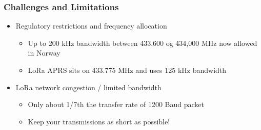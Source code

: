 \documentclass[aspectratio=169]{beamer}
\begin{document}
\begin{frame}[t]
  \frametitle{Challenges and Limitations}
  \begin{itemize}
    \item Regulatory restrictions and frequency allocation
    \medskip
    \begin{itemize}
      \item Up to 200 kHz bandwidth between 433,600 og 434,000 MHz now allowed in Norway
      \medskip
      \item LoRa APRS sits on 433.775 MHz and uses 125 kHz bandwidth
      \medskip
    \end{itemize}
    \item LoRa network congestion / limited bandwidth 
    \medskip
    \begin{itemize}
      \item Only about 1/7th the transfer rate of 1200 Baud packet
      \medskip
      \item Keep your transmissions as short as possible!
    \end{itemize}
  \end{itemize}
\end{frame}
\end{document}
